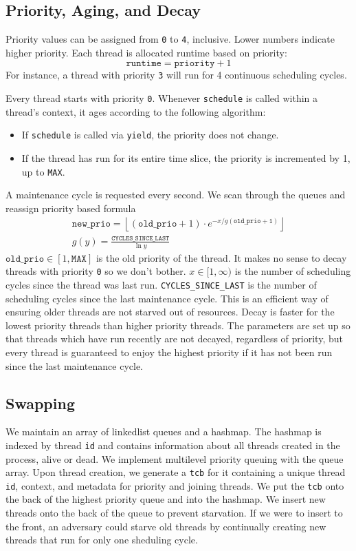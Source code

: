 \documentclass{article}
\begin{document}
\subsection{Priority, Aging, and Decay}
Priority values can be assigned from \verb|0| to \verb|4|, inclusive.
Lower numbers indicate higher priority.
Each thread is allocated runtime based on priority:
$$\mathtt{runtime} = {\mathtt{priority}} + 1$$
For instance, a thread with priority \verb|3| will run for 4 continuous scheduling cycles.

Every thread starts with priority \verb|0|. 
Whenever \verb|schedule| is called within a thread's context, it ages according to the following algorithm:
\begin{itemize}
\item If \verb|schedule| is called via \verb|yield|, the priority does not change.
\item If the thread has run for its entire time slice, the priority is incremented by 1, up to \verb|MAX|.
\end{itemize}

A maintenance cycle is requested every second. We scan through the queues and reassign priority based formula
\begin{gather*}
\mathtt{new\_prio} = \left\lfloor (\mathtt{old\_prio}+1) \cdot e^{-x/g(\mathtt{old\_prio+1})} \right\rfloor\\
g(y) = \frac{\mathtt{CYCLES\_SINCE\_LAST}}{\ln y}
\end{gather*}
$\mathtt{old\_prio} \in [1,\mathtt{MAX}]$ is the old priority of the thread. It makes no sense to decay threads with priority \verb|0| so we don't bother. $x \in [1,\infty)$ is the number of scheduling cycles since the thread was last run. \verb|CYCLES_SINCE_LAST| is the number of scheduling cycles since the last maintenance cycle.
This is an efficient way of ensuring older threads are not starved out of resources. Decay is faster for the lowest priority threads than higher priority threads. The parameters are set up so that threads which have run recently are not decayed, regardless of priority, but every thread is guaranteed to enjoy the highest priority if it has not been run since the last maintenance cycle.

\subsection{Swapping}
We maintain an array of linkedlist queues and a hashmap.
The hashmap is indexed by thread \verb|id| and contains information about all threads created in the process, alive or dead.
We implement multilevel priority queuing with the queue array.
Upon thread creation, we generate a \verb|tcb| for it containing a unique thread \verb|id|, context, and metadata for priority and joining threads.
We put the \verb|tcb| onto the back of the highest priority queue and into the hashmap.
We insert new threads onto the back of the queue to prevent starvation.
If we were to insert to the front, an adversary could starve old threads by continually creating new threads that run for only one sheduling cycle.
\end{document}
